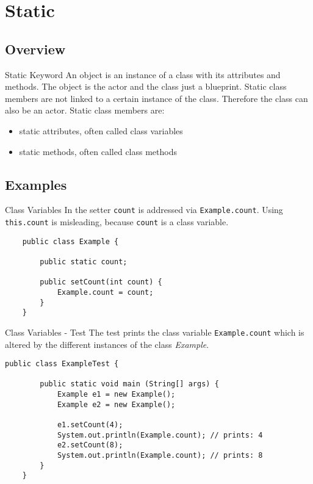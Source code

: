 \section{Static}
\subsection{Overview}
\begin{frame}{Static Keyword}
	An object is an instance of a class with its attributes and methods.
	The object is the actor and the class just a blueprint.
	\vfill
	Static class members are not linked to a certain instance of the class.
	Therefore the class can also be an actor.
	\vfill
	Static class members are:
	\begin{itemize}
		\item static attributes, often called class variables
		\item static methods, often called class methods
	\end{itemize}
\end{frame}

\subsection{Examples}
\begin{frame}[fragile]{Class Variables}
	In the setter \texttt{count} is addressed via \texttt{Example.count}.
	Using \texttt{this.count} is misleading, because \texttt{count} is a class variable.	
	\begin{lstlisting}
	public class Example {
	
	    public static count;

	    public setCount(int count) {
	        Example.count = count;
	    }
	}
	\end{lstlisting}
\end{frame}

\begin{frame}[fragile]{Class Variables - Test}
	The test prints the class variable \texttt{Example.count} which is altered
	by the different instances of the class \emph{Example}.	
	\begin{lstlisting}[basicstyle=\ttfamily\scriptsize]
	public class ExampleTest {
	
	    public static void main (String[] args) {
	        Example e1 = new Example();
	        Example e2 = new Example();
	        
	        e1.setCount(4);
	        System.out.println(Example.count); // prints: 4
	        e2.setCount(8);
	        System.out.println(Example.count); // prints: 8
	    }
	}
	\end{lstlisting}
\end{frame}

